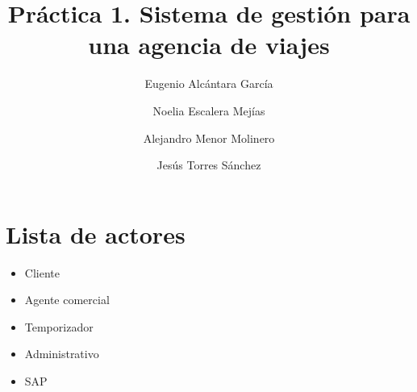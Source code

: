 \documentclass{article}
\title{Práctica 1. Sistema de gestión para una agencia de viajes}
\author{Eugenio Alcántara García\\
		\and Noelia Escalera Mejías\\
		\and Alejandro Menor Molinero\\
		\and Jesús Torres Sánchez}
\begin{document}
	\maketitle
	\section{Lista de actores}
	\begin{itemize}
		\item Cliente
		\item Agente comercial
		\item Temporizador
		\item Administrativo
		\item SAP
	\end{itemize}
	
\end{document}
